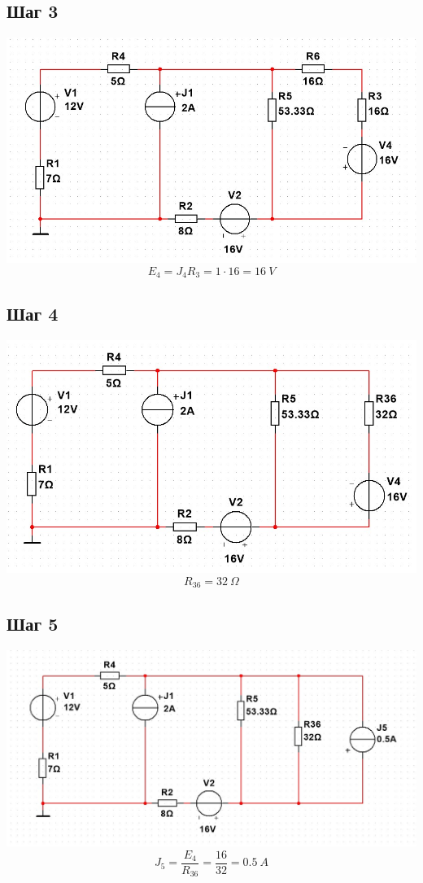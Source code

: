 \documentclass[14pt, a4paper]{article}
\begin{document}
    \subsection*{Шаг 3}
    \includegraphics[width=1\textwidth]{Stage3.jpg}
    $$E_4 = J_4 R_3 = 1 \cdot 16 = 16 \ V$$

    \subsection*{Шаг 4}
    \includegraphics[width=1\textwidth]{Stage4.jpg}
    $$R_{36} = 32 \ \Omega$$


    \subsection*{Шаг 5}
    \includegraphics[width=1\textwidth]{Stage5.jpg}
    $$J_5 = \frac{E_4}{R_{36}} = \frac{16}{32} = 0.5 \ A$$
\end{document}
